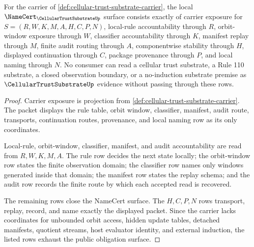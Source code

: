 \begin{theorem}
\label{thm:cellular-trust-substrate-obligation-surface}
For the carrier of \autoref{def:cellular-trust-substrate-carrier}, the local $\NameCert_{\CellularTrustSubstrateUp}$ surface consists exactly of carrier exposure for $S=(R,W,K,M,A,H,C,P,N)$, local-rule accountability through $R$, orbit-window exposure through $W$, classifier accountability through $K$, manifest replay through $M$, finite audit routing through $A$, componentwise stability through $H$, displayed continuation through $C$, package provenance through $P$, and local naming through $N$. No consumer can read a cellular trust substrate, a Rule 110 substrate, a closed observation boundary, or a no-induction substrate premise as $\CellularTrustSubstrateUp$ evidence without passing through these rows.
\end{theorem}
\begin{proof}
Carrier exposure is projection from \autoref{def:cellular-trust-substrate-carrier}. The packet displays the rule table, orbit window, classifier, manifest, audit route, transports, continuation routes, provenance, and local naming row as its only coordinates.

Local-rule, orbit-window, classifier, manifest, and audit accountability are read from $R,W,K,M,A$. The rule row decides the next state locally; the orbit-window row states the finite observation domain; the classifier row names only windows generated inside that domain; the manifest row states the replay schema; and the audit row records the finite route by which each accepted read is recovered.

The remaining rows close the NameCert surface. The $H,C,P,N$ rows transport, replay, record, and name exactly the displayed packet. Since the carrier lacks coordinates for unbounded orbit access, hidden update tables, detached manifests, quotient streams, host evaluator identity, and external induction, the listed rows exhaust the public obligation surface.
\end{proof}

